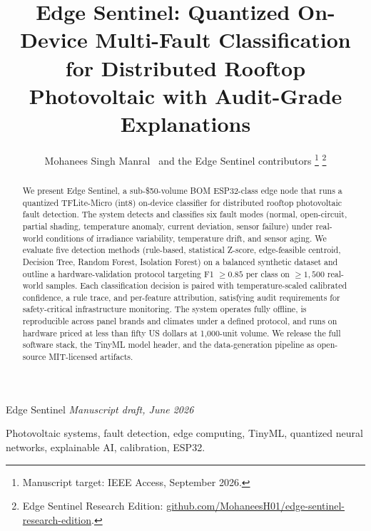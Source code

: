 \documentclass[12pt,journal,onecolumn]{IEEEtran}
\begin{document}
\title{Edge Sentinel: Quantized On-Device Multi-Fault Classification for
Distributed Rooftop Photovoltaic with Audit-Grade Explanations}

\author{Mohanees Singh Manral~
        and the Edge Sentinel contributors
\thanks{Manuscript target: IEEE Access, September 2026.}
\thanks{Edge Sentinel Research Edition:
\href{https://github.com/MohaneesH01/edge-sentinel-research-edition}{github.com/MohaneesH01/edge-sentinel-research-edition}.}}

{Edge Sentinel \emph{Manuscript draft, June 2026}}

\maketitle

\begin{abstract}
We present Edge Sentinel, a sub-\$50-volume BOM ESP32-class edge node that
runs a quantized TFLite-Micro (int8) on-device classifier for distributed
rooftop photovoltaic fault detection. The system detects and classifies six
fault modes (normal, open-circuit, partial shading, temperature anomaly,
current deviation, sensor failure) under real-world conditions of
irradiance variability, temperature drift, and sensor aging. We evaluate
five detection methods (rule-based, statistical Z-score, edge-feasible
centroid, Decision Tree, Random Forest, Isolation Forest) on a balanced
synthetic dataset and outline a hardware-validation protocol targeting
F1 $\geq 0.85$ per class on $\geq 1{,}500$ real-world samples. Each
classification decision is paired with temperature-scaled calibrated
confidence, a rule trace, and per-feature attribution, satisfying audit
requirements for safety-critical infrastructure monitoring. The system
operates fully offline, is reproducible across panel brands and climates
under a defined protocol, and runs on hardware priced at less than
fifty US dollars at 1{,}000-unit volume. We release the full software
stack, the TinyML model header, and the data-generation pipeline as
open-source MIT-licensed artifacts.
\end{abstract}

\begin{IEEEkeywords}
Photovoltaic systems, fault detection, edge computing, TinyML,
quantized neural networks, explainable AI, calibration, ESP32.
\end{IEEEkeywords}

\end{document}
